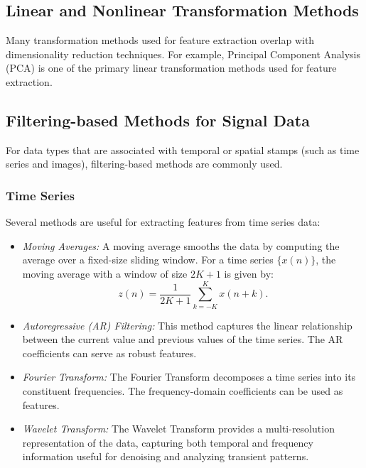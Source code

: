 \documentclass[12pt]{article}
\begin{document}
\subsection{Linear and Nonlinear Transformation Methods}
Many transformation methods used for feature extraction overlap with dimensionality reduction techniques. For example, Principal Component Analysis (PCA) is one of the primary linear transformation methods used for feature extraction.

\subsection{Filtering-based Methods for Signal Data}
For data types that are associated with temporal or spatial stamps (such as time series and images), filtering-based methods are commonly used.

\subsubsection{Time Series}
Several methods are useful for extracting features from time series data:
\begin{itemize}
    \item \textit{Moving Averages:}  
    A moving average smooths the data by computing the average over a fixed-size sliding window. For a time series \( \{x(n)\} \), the moving average with a window of size \(2K+1\) is given by:
    \begin{equation}
    z(n) = \frac{1}{2K+1} \sum_{k=-K}^{K} x(n+k).
    \end{equation}
    \item \textit{Autoregressive (AR) Filtering:}  
    This method captures the linear relationship between the current value and previous values of the time series. The AR coefficients can serve as robust features.
    \item \textit{Fourier Transform:}  
    The Fourier Transform decomposes a time series into its constituent frequencies. The frequency-domain coefficients can be used as features.
    \item \textit{Wavelet Transform:}  
    The Wavelet Transform provides a multi-resolution representation of the data, capturing both temporal and frequency information useful for denoising and analyzing transient patterns.
\end{itemize}
\end{document}
